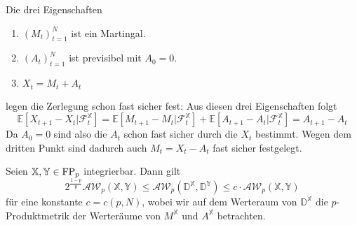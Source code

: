 Die drei Eigenschaften
\begin{enumerate}
    \item $(M_t)_{t=1}^N$ ist ein Martingal.
    \item $(A_t)_{t=1}^N$ ist previsibel mit $A_0=0$. 
    \item $X_t = M_t + A_t$
\end{enumerate}
legen die Zerlegung schon fast sicher fest: Aus diesen drei Eigenschaften folgt
$$\mathbb{E}[X_{t+1} - X_t \vert \mathcal{F}_t^\mathbb{X}] = \mathbb{E}[M_{t+1} - M_t \vert \mathcal{F}_t^\mathbb{X}] + \mathbb{E}[A_{t+1} - A_t \vert \mathcal{F}_t^\mathbb{X}] = A_{t+1} - A_t$$
Da $A_0=0$ sind also die $A_t$ schon fast sicher durch die $X_t$ bestimmt. Wegen dem dritten Punkt sind dadurch auch $M_t = X_t - A_t$ fast sicher festgelegt. 
\begin{proposition}
    Seien $\mathbb{X,Y}\in \operatorname{FP}_p$ integrierbar. Dann gilt
    $$2^{\frac{1-p}{p}}\mathcal{AW}_p(\mathbb{X,Y}) \leq \mathcal{AW}_p(\mathbb{D}^\mathbb{X}, \mathbb{D}^\mathbb{Y}) \leq c\cdot \mathcal{AW}_p(\mathbb{X,Y})$$
    für eine konstante $c=c(p,N)$, wobei wir auf dem Werteraum von $\mathbb{D}^\mathbb{X}$ die $p$-Produktmetrik der Werteräume von $M^\mathbb{X}$ und $A^\mathbb{X}$ betrachten.
\end{proposition}
